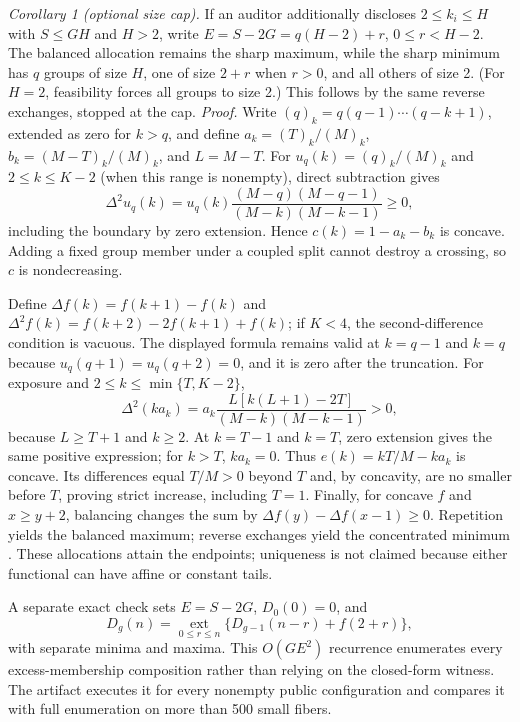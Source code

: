 \documentclass[conference,10pt]{IEEEtran}
\begin{document}
\noindent\emph{Corollary 1 (optional size cap).} If an auditor additionally discloses $2\leq k_i\leq H$ with $S\leq GH$ and $H>2$, write $E=S-2G=q(H-2)+r$, $0\leq r<H-2$. The balanced allocation remains the sharp maximum, while the sharp minimum has $q$ groups of size $H$, one of size $2+r$ when $r>0$, and all others of size 2. (For $H=2$, feasibility forces all groups to size 2.) This follows by the same reverse exchanges, stopped at the cap.
\noindent\emph{Proof.} Write $(q)_k=q(q-1)\cdots(q-k+1)$, extended as zero for $k>q$, and define $a_k=(T)_k/(M)_k$, $b_k=(M-T)_k/(M)_k$, and $L=M-T$. For $u_q(k)=(q)_k/(M)_k$ and $2\leq k\leq K-2$ (when this range is nonempty), direct subtraction gives
\begin{equation}
\Delta^2u_q(k)=u_q(k)\frac{(M-q)(M-q-1)}{(M-k)(M-k-1)}\geq0,
\end{equation}
including the boundary by zero extension. Hence $c(k)=1-a_k-b_k$ is concave. Adding a fixed group member under a coupled split cannot destroy a crossing, so $c$ is nondecreasing.

Define $\Delta f(k)=f(k+1)-f(k)$ and $\Delta^2f(k)=f(k+2)-2f(k+1)+f(k)$; if $K<4$, the second-difference condition is vacuous. The displayed formula remains valid at $k=q-1$ and $k=q$ because $u_q(q+1)=u_q(q+2)=0$, and it is zero after the truncation. For exposure and $2\leq k\leq\min\{T,K-2\}$,
\begin{equation}
\Delta^2(ka_k)=a_k\frac{L[k(L+1)-2T]}{(M-k)(M-k-1)}>0,
\end{equation}
because $L\geq T+1$ and $k\geq2$. At $k=T-1$ and $k=T$, zero extension gives the same positive expression; for $k>T$, $ka_k=0$. Thus $e(k)=kT/M-ka_k$ is concave. Its differences equal $T/M>0$ beyond $T$ and, by concavity, are no smaller before $T$, proving strict increase, including $T=1$. Finally, for concave $f$ and $x\geq y+2$, balancing changes the sum by $\Delta f(y)-\Delta f(x-1)\geq0$. Repetition yields the balanced maximum; reverse exchanges yield the concentrated minimum \cite{marshall2011}. These allocations attain the endpoints; uniqueness is not claimed because either functional can have affine or constant tails.

A separate exact check sets $E=S-2G$, $D_0(0)=0$, and
\begin{equation}
D_g(n)=\underset{0\leq r\leq n}{\operatorname{ext}}
\{D_{g-1}(n-r)+f(2+r)\},
\end{equation}
with separate minima and maxima. This $O(GE^2)$ recurrence enumerates every excess-membership composition rather than relying on the closed-form witness. The artifact executes it for every nonempty public configuration and compares it with full enumeration on more than 500 small fibers.
\end{document}
